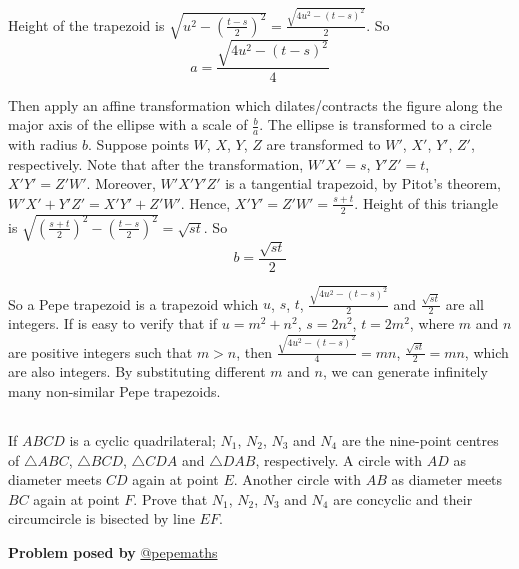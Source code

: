 \documentclass[12pt]{article}
\begin{document}
Height of the trapezoid is $\sqrt{u^2-(\frac{t-s}{2})^2}=\frac{\sqrt{4u^2-(t-s)^2}}{2}$. So
\begin{equation}\label{eq1}
a=\frac{\sqrt{4u^2-(t-s)^2}}{4}
\end{equation}

Then apply an affine transformation which dilates/contracts the figure along the major axis of the ellipse with a scale of $\frac{b}{a}$. The ellipse is transformed to a circle with radius $b$. Suppose points $W$, $X$, $Y$, $Z$ are transformed to $W'$, $X'$, $Y'$, $Z'$, respectively. Note that after the transformation, $W'X'=s$, $Y'Z'=t$, $X'Y'=Z'W'$. Moreover, $W'X'Y'Z'$ is a tangential trapezoid, by Pitot's theorem, $W'X'+Y'Z'=X'Y'+Z'W'$. Hence, $X'Y'=Z'W'=\frac{s+t}{2}$. Height of this triangle is $\sqrt{(\frac{s+t}{2})^2-(\frac{t-s}{2})^2}=\sqrt{st}$. So
\begin{equation}\label{eq2}
b=\frac{\sqrt{st}}{2}
\end{equation}

So a Pepe trapezoid is a trapezoid which $u$, $s$, $t$, $\frac{\sqrt{4u^2-(t-s)^2}}{2}$ and $\frac{\sqrt{st}}{2}$ are all integers. If is easy to verify that if $u=m^2+n^2$, $s=2n^2$, $t=2m^2$, where $m$ and $n$ are positive integers such that $m>n$, then $\frac{\sqrt{4u^2-(t-s)^2}}{4}=mn$,  $\frac{\sqrt{st}}{2}=mn$, which are also integers. By substituting different $m$ and $n$, we can generate infinitely many non-similar Pepe trapezoids.







\subsection*{}
If $ABCD$ is a cyclic quadrilateral; $N_1$, $N_2$, $N_3$ and $N_4$ are the nine-point centres of $\triangle ABC$, $\triangle BCD$, $\triangle CDA$ and $\triangle DAB$, respectively. A circle with $AD$ as diameter meets $CD$ again at point $E$. Another circle with $AB$ as diameter meets $BC$ again at point $F$. Prove that $N_1$, $N_2$, $N_3$ and $N_4$ are concyclic and their circumcircle is bisected by line $EF$.

\begin{flushright}
\textbf{Problem posed by}
\textcolor{RoyalBlue2}{\href{https://www.instagram.com/pepemaths/}{@pepemaths}}
\end{flushright}
\end{document}
